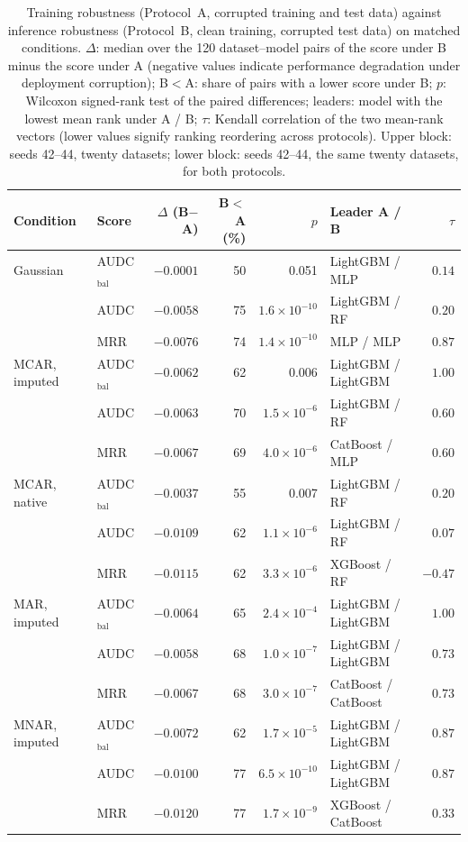 \begin{table}[t]
\centering
\footnotesize
\caption{Training robustness (Protocol~A, corrupted training and test data) against inference robustness (Protocol~B, clean training, corrupted test data) on matched conditions. $\Delta$: median over the 120 dataset--model pairs of the score under B minus the score under A (negative values indicate performance degradation under deployment corruption); B$<$A: share of pairs with a lower score under B; $p$: Wilcoxon signed-rank test of the paired differences; leaders: model with the lowest mean rank under A / B; $\tau$: Kendall correlation of the two mean-rank vectors (lower values signify ranking reordering across protocols). Upper block: seeds 42--44, twenty datasets; lower block: seeds 42--44, the same twenty datasets, for both protocols.}
\label{tab:protocol}
\begin{tabular}{@{}llrrrlr@{}}
\toprule
Condition & Score & $\Delta$ (B$-$A) & B$<$A (\%) & $p$ & Leader A / B & $\tau$ \\
\midrule
Gaussian & AUDC$_{\mathrm{bal}}$ & $-0.0001$ & 50 & 0.051 & LightGBM / MLP & $0.14$ \\
 & AUDC & $-0.0058$ & 75 & $1.6\times10^{-10}$ & LightGBM / RF & $0.20$ \\
 & MRR & $-0.0076$ & 74 & $1.4\times10^{-10}$ & MLP / MLP & $0.87$ \\
MCAR, imputed & AUDC$_{\mathrm{bal}}$ & $-0.0062$ & 62 & 0.006 & LightGBM / LightGBM & $1.00$ \\
 & AUDC & $-0.0063$ & 70 & $1.5\times10^{-6}$ & LightGBM / RF & $0.60$ \\
 & MRR & $-0.0067$ & 69 & $4.0\times10^{-6}$ & CatBoost / MLP & $0.60$ \\
MCAR, native & AUDC$_{\mathrm{bal}}$ & $-0.0037$ & 55 & 0.007 & LightGBM / RF & $0.20$ \\
 & AUDC & $-0.0109$ & 62 & $1.1\times10^{-6}$ & LightGBM / RF & $0.07$ \\
 & MRR & $-0.0115$ & 62 & $3.3\times10^{-6}$ & XGBoost / RF & $-0.47$ \\
\midrule
MAR, imputed & AUDC$_{\mathrm{bal}}$ & $-0.0064$ & 65 & $2.4\times10^{-4}$ & LightGBM / LightGBM & $1.00$ \\
 & AUDC & $-0.0058$ & 68 & $1.0\times10^{-7}$ & LightGBM / LightGBM & $0.73$ \\
 & MRR & $-0.0067$ & 68 & $3.0\times10^{-7}$ & CatBoost / CatBoost & $0.73$ \\
MNAR, imputed & AUDC$_{\mathrm{bal}}$ & $-0.0072$ & 62 & $1.7\times10^{-5}$ & LightGBM / LightGBM & $0.87$ \\
 & AUDC & $-0.0100$ & 77 & $6.5\times10^{-10}$ & LightGBM / LightGBM & $0.87$ \\
 & MRR & $-0.0120$ & 77 & $1.7\times10^{-9}$ & XGBoost / CatBoost & $0.33$ \\
\bottomrule
\end{tabular}
\end{table}
